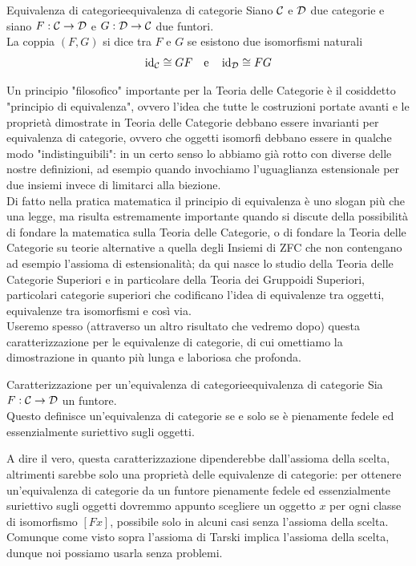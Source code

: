 \documentclass[openany]{book}
\renewcommand\C{\mc{C}}
\newcommand\D{\mc{D}}
\begin{document}
\begin{definition}{Equivalenza di categorie}{equivalenza di categorie}
    Siano $\C$ e $\D$ due categorie e siano $F:\C\to\D$ e $G:\D\to\C$ due funtori.\\
    La coppia $(F,G)$ si dice  tra $F$ e $G$ se esistono due isomorfismi naturali
    \[ \id_\C \cong GF \quad\text{e}\quad \id_\D \cong FG\]
\end{definition}

Un principio "filosofico" importante per la Teoria delle Categorie è il cosiddetto "principio di equivalenza", ovvero l'idea che tutte le costruzioni portate avanti e le proprietà dimostrate in Teoria delle Categorie debbano essere invarianti per equivalenza di categorie, ovvero che oggetti isomorfi debbano essere in qualche modo "indistinguibili": in un certo senso lo abbiamo già rotto con diverse delle nostre definizioni, ad esempio quando invochiamo l'uguaglianza estensionale per due insiemi invece di limitarci alla biezione.\\
Di fatto nella pratica matematica il principio di equivalenza è uno slogan più che una legge, ma risulta estremamente importante quando si discute della possibilità di fondare la matematica sulla Teoria delle Categorie, o di fondare la Teoria delle Categorie su teorie alternative a quella degli Insiemi di ZFC che non contengano ad esempio l'assioma di estensionalità; da qui nasce lo studio della Teoria delle Categorie Superiori e in particolare della Teoria dei Gruppoidi Superiori, particolari categorie superiori che codificano l'idea di equivalenze tra oggetti, equivalenze tra isomorfismi e così via.\\
Useremo spesso (attraverso un altro risultato che vedremo dopo) questa caratterizzazione per le equivalenze di categorie, di cui omettiamo la dimostrazione in quanto più lunga e laboriosa che profonda.

\begin{proposition}{Caratterizzazione per un'equivalenza di categorie}{equivalenza di categorie}
    Sia $F : \C\to\D$ un funtore.\\
    Questo definisce un'equivalenza di categorie se e solo se è pienamente fedele ed essenzialmente suriettivo sugli oggetti.
\end{proposition}

A dire il vero, questa caratterizzazione dipenderebbe dall'assioma della scelta, altrimenti sarebbe solo una proprietà delle equivalenze di categorie: per ottenere un'equivalenza di categorie da un funtore pienamente fedele ed essenzialmente suriettivo sugli oggetti dovremmo appunto scegliere un oggetto $x$ per ogni classe di isomorfismo $[Fx]$, possibile solo in alcuni casi senza l'assioma della scelta. Comunque come visto sopra l'assioma di Tarski implica l'assioma della scelta, dunque noi possiamo usarla senza problemi.
\end{document}
